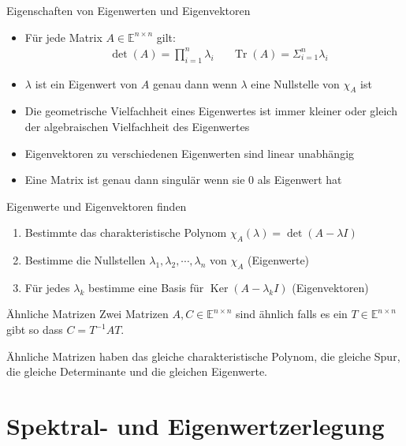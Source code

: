 \documentclass[a4paper,10pt]{article}
\DeclareMathOperator{\Tr}{Tr}
\DeclareMathOperator{\Kernel}{Ker}
\def\E{\mathbb{E}}
\begin{document}
\begin{subbox}{Eigenschaften von Eigenwerten und Eigenvektoren}
  \begin{itemize}
    \item{
      Für jede Matrix $A \in \mathbb{E}^{n \times n}$ gilt:
      \begin{align*}
        & \det(A) = \prod_{i=1}^{n} \lambda_i & & \Tr(A) = \Sigma_{i=1}^n \lambda_i
      \end{align*}
    }
    \item $\lambda$ ist ein Eigenwert von $A$ genau dann wenn $\lambda$ eine Nullstelle von $\chi_A$ ist
    \item Die geometrische Vielfachheit eines Eigenwertes ist immer kleiner oder gleich der algebraischen Vielfachheit des Eigenwertes
    \item Eigenvektoren zu verschiedenen Eigenwerten sind linear unabhängig
    \item Eine Matrix ist genau dann singulär wenn sie $0$ als Eigenwert hat
  \end{itemize}
\end{subbox}

\begin{subbox}{Eigenwerte und Eigenvektoren finden}
  \begin{enumerate}
    \item Bestimmte das charakteristische Polynom $\chi_A(\lambda) = \det(A - \lambda I)$
    \item Bestimme die Nullstellen $\lambda_1, \lambda_2, \cdots, \lambda_n$ von $\chi_A$ (Eigenwerte)
    \item Für jedes $\lambda_k$ bestimme eine Basis für $\Kernel(A - \lambda_k I)$ (Eigenvektoren)
  \end{enumerate}
\end{subbox}

\begin{subbox}{Ähnliche Matrizen}
  Zwei Matrizen $A, C \in \E^{n \times n}$ sind ähnlich falls es ein $T \in \E^{n \times n}$ gibt so dass $C = T^{-1} A T$.

  Ähnliche Matrizen haben das gleiche charakteristische Polynom, die gleiche Spur, die gleiche Determinante und die gleichen Eigenwerte.
\end{subbox}

\section{Spektral- und Eigenwertzerlegung}
\end{document}
